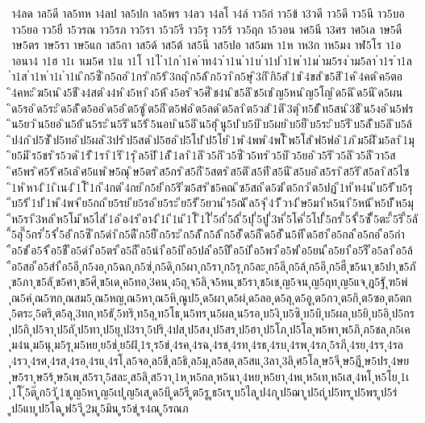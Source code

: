 {า4ลด
าล5ดี
าล5ทห
า4ลป
าล5ปก
าล5พร
า4ลว
า4ลโ
า4ล์
าว5ก่
าว5ข้
า3วดี
าว5ดึ
าว5นี
าว5บอ
าว5ยอ
าว5ยื
า5วรณ
าว5รภ
าว5รา
า5ว5รี
าว5รุ
าว5ร้
าว5ฤก
า5วอน
าศ5นี
า3ศร
าศ5เล
าษ5ดื
าษ5ตร
าษ5รา
าษ5แก
าส5กา
าส5ด้
าส5ต้
าส5นี
าส5ปอ
าส5มห
า1ห
าห3ก
าห5มง
าฬ5โร
า1อ
าอนา4
า1ฮ
า1เ
าเม5ศ
า1แ
า1โ
า1ไ
ำ1ก
ำ1ค
ำท4ว
ำ1น
ำ1บ
ำ1ป
ำ1พ
ำ1ม
ำม5รง
ำม5ลา
ำ1ร
ำ1ล
ำ1ส
ำ1ห
ำ1เ
ำ1แ
ิก5ซี
ิก5ถอ
ิ1กร
ิก5ร้
ิ3กฤ
ิก5ล้
ิก5วา
ิก5ษุ
ิ3กิ
ิกิ5ส
ิ1ข
ิ4ขส
ิข5สิ
ิ1ค
ิ4คต
ิค5ตอ
ิ4คหะ
ิฆ5เน
ิง5ชี
ิง4สต
ิง4ห
ิง5หา
ิง5ห้
ิง5อร
ิจ5ศี
ิช4น
ิช5ลิ
ิช5เช
ิญ5หน
ิญ5โญ
ิด5ฉิ
ิด5นี
ิด5ผน
ิด5รอ
ิด5ระ
ิด5ลั
ิด5ออ
ิด5อ่
ิต5ซู
ิต5ถี
ิต5ฟอ
ิต5ลด
ิต5ลา
ิต5วส
ิ1ติ
ิ3ตุ
ิท5ธั
ิท5สน
ิ3ธี
ิน5งอ
ิน5ฟร
ิน5ยว
ิน5ยอ
ิน5ย้
ิน5ระ
ิน5ริ
ิน5ร้
ิ5นอบ
ิน5อิ
ิน5ฮุ
ินู5ป
ิบ5บิ
ิบ5ผย
ิบ5ยื
ิบ5ระ
ิบ5รี
ิบ5ลั
ิบ5ลิ
ิบ5ล้
ิป4ก
ิป5ซั
ิป5ทอ
ิป5ผล
ิ3ปร
ิป5สต
ิป5ฮอ
ิป5โป
ิป5โย
ิ1พ
ิ4พพ
ิ4พโ
ิพ5โส
ิฟ5ฟอ
ิ1ภ
ิม5ฝี
ิม5ลา
ิ1มุ
ิย5มิ
ิร5ชร
ิร5วด
ิ1รั
ิ1รา
ิ1ริ
ิ1รุ
ิล5ปิ
ิ1ลั
ิ1ลา
ิ1ลิ
ิว5กิ
ิว5ซี
ิว5ทร
ิว5บิ
ิว5ยอ
ิว5ริ
ิว5ลิ
ิว5ลึ
ิวา5ส
ิศ5พร
ิศ5ร้
ิศ5เล
ิศ5แพ
ิษ5ณุ
ิษ5ตร
ิส5กร
ิส5กี
ิ5สตร
ิส5ติ
ิส5ที
ิส5นี
ิส5บอ
ิส5รา
ิส5ริ
ิส5ลา
ิส5ไซ
ิ1ห
ิหา4
ิ1เ
ิเน4
ิ1โ
ี1ก
ี4กต
ี4กย
ีก5ย่
ีก5ริ
ีฆ5สร
ีช5คณ
ีซ5สถ
ีด5ฆ่
ีต5กว
ีต5ปฏ
ี1ท
ีท4น
ีบ5รั
ีบ5รุ
ีบ5ร้
ี1ป
ี1พ
ี4พจ
ีย5กถ
ีย5รย
ีย5รอ
ีย5ระ
ีย5รั
ี5ยวน
ีร5ณั
ีล5จุ
ี4วั
ีวา4
ีษ5มา
ีห5นา
ี5หน้
ีห5บั
ีห5มุ
ีห5รา
ี3หล
ีห5โม
ีห5ไส
ี1อ
ีอ4ร
ีอา4
ี1เ
ี1แ
ี1โ
ี1ไ
ี่5ก่
ี่5ถ้
ี่5ปุ
ี่5ปู
ี่3ห
ี่5โค
ี่5โป
ี้5กร
ี้5จ้
ี้5ซั
ี้5ตะ
ี้5ริ
ี้5ลั
ี้5ลุ
ี๊5กร
ี๋5จ้
ี๋5อ๋
ึก5ซึ
ึก5ดำ
ึก5ดื
ึก5ยื
ึก5ระ
ึก5ลั
ึก5ล้
ึก5ฮั
ึด5ถื
ึด5ฮั
ึน5ทึ
ืด5ฮา
ือ5กล
ือ5กอ
ือ5กำ
ือ5ข่
ือ5จ้
ือ5ชื
ือ5ดำ
ือ5ตร
ือ5ถื
ือ5นำ
ือ5บิ
ือ5ปล
ือ5ปื
ือ5ป่
ือ5พว
ือ5พ่
ือ5ยน
ือ5ยา
ือ5รื
ือ5ลา
ือ5ล้
ือ5สอ
ือ5สำ
ือ5อี
ุก5งอ
ุก5ฉก
ุก5ซ่
ุก5ดิ
ุก5ผา
ุก5รา
ุก5รุ
ุก5ละ
ุก5ลี
ุก5ล้
ุก5อี
ุก5ฮื
ุข5นา
ุข5ปา
ุข5ภั
ุข5ภา
ุข5ลั
ุข5ศา
ุข5ศึ
ุข5เด
ุค5ทอ
ุ3คน
ุง5ถุ
ุจ5ลิ
ุจ5หน
ุช5รา
ุช5เช
ุญ5จน
ุญ5ฤท
ุญ5แจ
ุฎ5ฐั
ุฑ5พ่
ุณ5ค่
ุณ5ฑก
ุณสม5
ุณ5หญ
ุณ5หา
ุณ5หิ
ุณูป5
ุด5ผา
ุด5ผ่
ุด5ลอ
ุด5ลุ
ุด5อู
ุต5กว
ุต5กิ
ุต5ซอ
ุต5ตก
ุ5ตระ
ุ5ตริ
ุต5ลุ
ุ3ทก
ุท5ธั
ุ5ทริ
ุท5ลุ
ุท5โธ
ุน5ทร
ุน5ผล
ุน5รอ
ุบ5งิ
ุบ5ซิ
ุบ5บิ
ุบ5ผล
ุบ5ยิ
ุบ5อิ
ุป5กร
ุป5กิ
ุป5จา
ุป5ถั
ุป5ทา
ุป5ยุ
ุป3รา
ุ5ปริ
ุ4ปส
ุป5สง
ุป5สร
ุป5ฮา
ุป5โภ
ุป5โล
ุพ5พา
ุพ5ภิ
ุภ5ชล
ุภ5เค
ุม4น
ุม5นุ
ุม5รุ
ุม5หย
ุย5ช่
ุย5ฝ้
ุ1ร
ุร5ข่
ุ4รค
ุ4รฉ
ุ4รช
ุ4รท
ุ4รธ
ุ4รบ
ุ4รพ
ุ4รภ
ุ5รภี
ุ4รย
ุ4รร
ุ4รล
ุ4รว
ุ4รศ
ุ4รส
ุ4รอ
ุ4รแ
ุ4รโ
ุล5จอ
ุล5ชี
ุล5ธิ
ุล5มุ
ุล5สต
ุล5สแ
ุ3ลา
ุ3ลิ
ุศ5โล
ุษ5จี
ุษ5ฎี
ุษ5ปร
ุ4ษย
ุษ5รา
ุษ5ร้
ุษ5เพ
ุส5รา
ุ5สละ
ุส5ลิ
ุส5วา
ุ1ห
ุห5กล
ุห5นา
ุ4หย
ุห5ยา
ุ4หเ
ุห5เท
ุห5เส
ุ4หโ
ุห5โย
ุ1เ
ุ1โ
ุ๊5ต๊
ูก5วั
ู1ช
ูญ5หา
ูญ5เป
ูญ5เส
ูด5บึ
ูด5รี
ูต5รู
ูธ5เร
ูบ5ไล
ูป4ก
ูป5ฌา
ูป5ถ่
ูป5ทร
ูป5พร
ูป5ร่
ูป5แบ
ูป5โฉ
ูฟ5วี
ู2ม
ู5มิน
ูร5ข่
ูร4ณ
ู5รณภ
}
